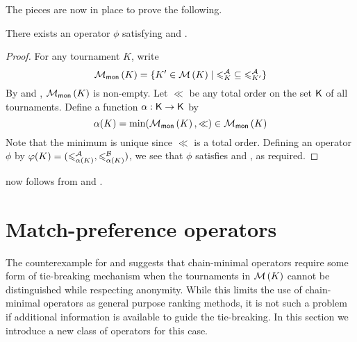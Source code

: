 The pieces are now in place to prove the following.

\begin{proposition}
    \label{tourn_result_chainmin_mon_compatibility}
    There exists an operator $\phi$ satisfying \chainmin{} and
    \mon{}.
\end{proposition}

\begin{proof}
    For any tournament $K$, write
    \[
        \operatorname{\mathcal{M}}_{\mathsf{mon}}\left({K}\right) = \{
            K' \in \operatorname{\mathcal{M}}\left({K}\right) \mid {\leqslant^{\mathcal{A}}_K} \subseteq {\leqslant^{\mathcal{A}}_{K'}}
        \}
    \]
    By  and
    , $\operatorname{\mathcal{M}}_{\mathsf{mon}}\left({K}\right)$ is non-empty. Let
    $\ll$ be any total order on the set $\mathsf{K}$ of all tournaments.
    Define a function $\alpha: \mathsf{K} \to \mathsf{K}$ by
    \[
        \alpha(K) = \min(\operatorname{\mathcal{M}}_{\mathsf{mon}}\left({K}\right), {\ll}) \in \operatorname{\mathcal{M}}_{\mathsf{mon}}\left({K}\right)
    \]
    Note that the minimum is unique since ${\ll}$ is a total order. Defining an
    operator $\phi$ by $\varphi(K) = ({\leqslant^{\mathcal{A}}_{\alpha(K)}}, {\leqslant^{\mathcal{B}}_{\alpha(K)}})$,
    we see that $\phi$ satisfies \chainmin{} and \mon{}, as
    required.
\end{proof}

 now follows from
 and
.

\section{Match-preference operators}
\label{tourn_sec_match_preference_operators}


The counterexample for \chainmin{} and \anon{} suggests that
chain-minimal operators require some form of tie-breaking mechanism when the
tournaments in $\operatorname{\mathcal{M}}\left({K}\right)$ cannot be distinguished while respecting anonymity.
While this limits the use of chain-minimal operators as general purpose ranking
methods, it is not such a problem if additional information is available to
guide the tie-breaking. In this section we introduce a new class of operators
for this case.

